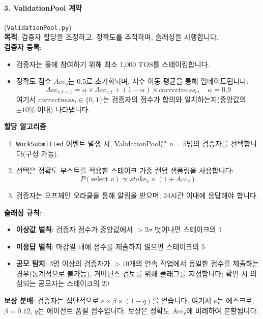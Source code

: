 \documentclass[11pt]{article}
\begin{document}
\paragraph{3. ValidationPool 계약} (\texttt{ValidationPool.py})\\
\textbf{목적}: 검증자 할당을 조정하고, 정확도를 추적하며, 슬래싱을 시행합니다.\\
\textbf{검증자 등록}:
\begin{itemize}[noitemsep]
  \item 검증자는 풀에 참여하기 위해 최소 1,000 TOS를 스테이킹합니다.
  \item 정확도 점수 $Acc_v$는 0.5로 초기화되며, 지수 이동 평균을 통해 업데이트됩니다:
    \begin{equation}
    Acc_{v,t+1} = \alpha \times Acc_{v,t} + (1-\alpha) \times correctness_t, \quad \alpha = 0.9
    \end{equation}
    여기서 $correctness_t \in \{0,1\}$는 검증자의 점수가 합의와 일치하는지(중앙값의 $\pm10\%$ 이내) 나타냅니다.
\end{itemize}
\textbf{할당 알고리즘}:
\begin{enumerate}[noitemsep]
  \item \texttt{WorkSubmitted} 이벤트 발생 시, ValidationPool은 $n=5$명의 검증자를 선택합니다(구성 가능).
  \item 선택은 정확도 부스트를 적용한 스테이크 가중 랜덤 샘플링을 사용합니다:
    \begin{equation}
    P(\text{select } v) \propto stake_v \times (1 + Acc_v)
    \end{equation}
  \item 검증자는 오프체인 오라클을 통해 알림을 받으며; 24시간 이내에 응답해야 합니다.
\end{enumerate}
\textbf{슬래싱 규칙}:
\begin{itemize}[noitemsep]
  \item \textbf{이상값 벌칙}: 검증자 점수가 중앙값에서 $>2\sigma$ 벗어나면 스테이크의 1%
  \item \textbf{미응답 벌칙}: 마감일 내에 점수를 제출하지 않으면 스테이크의 5%
  \item \textbf{공모 탐지}: 3명 이상의 검증자가 $>10$개의 연속 작업에서 동일한 점수를 제출하는 경우(통계적으로 불가능), 거버넌스 검토를 위해 플래그를 지정합니다; 확인 시 의심되는 공모자는 스테이크의 20%
\end{itemize}
\textbf{보상 분배}: 검증자는 집단적으로 $e \times \beta \times (1-q)$를 얻습니다. 여기서 $e$는 에스크로, $\beta=0.12$, $q$는 에이전트 품질 점수입니다. 보상은 정확도 $Acc_v$에 비례하여 분할됩니다.
\end{document}
